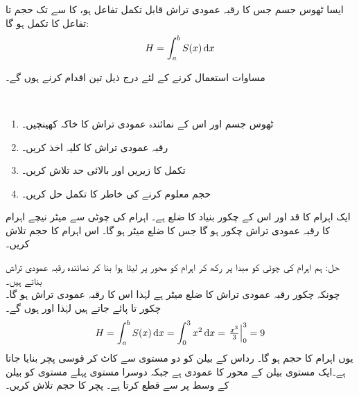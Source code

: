 ایسا ٹھوس جسم جس کا رقبہ عمودی تراش  قابل تکمل تفاعل ہو،  کا  سے  تک حجم   تا  تفاعل  کا تکمل ہو گا:
\begin{align}\label{مساوات_تکمل_استعمال_تعریف_حجم_الف}
H=\int_a^b S(x)\dif x
\end{align}

مساوات  استعمال کرنے کے لئے درج ذیل تین اقدام کرنے ہوں گے۔

\\
\begin{enumerate}[1.]
\item
ٹھوس جسم  اور اس کے نمائندہ عمودی تراش کا خاکہ کھینچیں۔
\item
 رقبہ عمودی تراش  کا کلیہ اخذ کریں۔
\item
تکمل کا زیریں اور بالائی حد تلاش کریں۔
\item
حجم معلوم کرنے کی خاطر  کا تکمل حل کریں۔
\end{enumerate}

ایک اہرام کا قد  اور اس کے چکور بنیاد کا ضلع  ہے۔ اہرام کی چوٹی سے  میٹر نیچے اہرام کا رقبہ عمودی تراش چکور ہو گا جس کا ضلع  میٹر ہو گا۔ اس اہرام کا حجم تلاش کریں۔

حل:\quad
{}\quad
{}\quad
ہم اہرام کی چوٹی کو مبدا پر رکھ کر اہرام کو  محور پر لیٹا ہوا بنا کر نمائندہ رقبہ عمودی تراش بناتے ہیں۔\\
\quad
{}
\quad
چونکہ چکور رقبہ عمودی تراش کا ضلع  میٹر ہے لہٰذا اس کا رقبہ عمودی تراش  ہو گا۔\\
\quad
{}\quad
چکور  تا  پائے جاتے ہیں لہٰذا  اور  ہوں گے۔\\
\quad {}
\begin{align*}
H=\int_a^bS(x)\dif x=\int_0^3x^2\dif x=\left.\tfrac{x^3}{3}\right\vert_0^3=9
\end{align*}
یوں اہرام کا حجم  ہو گا۔
رداس  کے بیلن کو دو مستوی سے کاٹ کر قوسی پچر بنایا جاتا ہے۔ایک مستوی بیلن کے محور کا عمودی ہے جبکہ دوسرا مستوی پہلے مستوی کو بیلن کے وسط پر  سے قطع کرتا ہے۔ پچر کا حجم تلاش کریں۔

